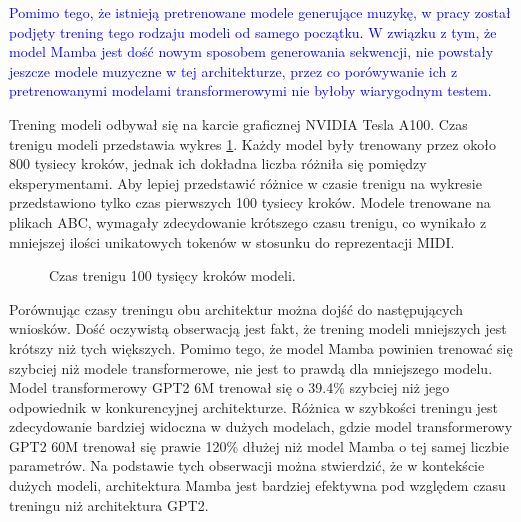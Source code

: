 \documentclass[data-science]{agh-wi} %
\begin{document}
\textcolor{blue}{Pomimo tego, że istnieją pretrenowane modele generujące muzykę, w pracy został podjęty trening tego rodzaju modeli od samego początku. W związku z tym, że model Mamba jest dość nowym sposobem generowania sekwencji, nie powstały jeszcze modele muzyczne w tej architekturze, przez co porówywanie ich z pretrenowanymi modelami transformerowymi nie byłoby wiarygodnym testem.}

Trening modeli odbywał się na karcie graficznej NVIDIA Tesla A100. Czas trenigu modeli przedstawia wykres \ref*{fig:czas_treningu}. Każdy model były trenowany przez około 800 tysiecy kroków, jednak ich dokładna liczba różniła się pomiędzy eksperymentami. Aby lepiej przedstawić różnice w czasie trenigu na wykresie przedstawiono tylko czas pierwszych 100 tysiecy kroków. Modele trenowane na plikach ABC, wymagały zdecydowanie krótszego czasu trenigu, co wynikało z mniejszej ilości unikatowych tokenów w stosunku do reprezentacji MIDI.

\begin{figure}[ht!]
    \centering
    \caption{Czas trenigu 100 tysięcy kroków modeli.}\label{fig:czas_treningu}
\end{figure}

Porównując czasy treningu obu architektur można dojść do następujących wniosków. Dość oczywistą obserwacją jest fakt, że trening modeli mniejszych jest krótszy niż tych większych. Pomimo tego, że model Mamba powinien trenować się szybciej niż modele transformerowe, nie jest to prawdą dla mniejszego modelu. Model transformerowy GPT2 6M trenował się o 39.4\% szybciej niż jego odpowiednik w konkurencyjnej architekturze. Różnica w szybkości treningu jest zdecydowanie bardziej widoczna w dużych modelach, gdzie model transformerowy GPT2 60M trenował się prawie 120\% dłużej niż model Mamba o tej samej liczbie parametrów. Na podstawie tych obserwacji można stwierdzić, że w kontekście dużych modeli, architektura Mamba jest bardziej efektywna pod względem czasu treningu niż architektura GPT2.
\end{document}
